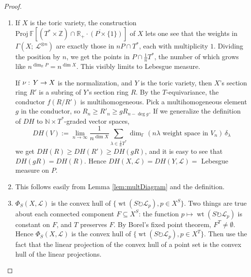 \documentclass[10pt,a4paper]{amsart}
\DeclareMathOperator{\wt}{wt}
\newcommand{\RR}{\mathbb{R}}
\newcommand{\ZZ}{\mathbb{Z}}
\newcommand{\NN}{\mathbb{N}}
\newcommand\wh\widehat
\newcommand\FF{{\mathbb F}}
\newcommand\tensor\otimes
\newcommand\calL{{\mathcal L}}
\newcommand\onto\twoheadrightarrow
\newcommand\junk[1]{}
\newcommand\actson\circlearrowright
\renewcommand{\colon}{\mathrel{:}}
\renewcommand{\colon}{:\mkern\thinmuskip}
\begin{document}
\begin{proof}
  \begin{enumerate}
  \item If $X$ is the toric variety, the construction ${\mathrm {Proj}}\
   \FF\left[(T^* \times \ZZ) \cap \overline{\RR_+\cdot (P \times \{1\})}\right]$
    of $X$ lets
    one see that the weights in $\Gamma(X;\ \calL^{\tensor n})$ are exactly those
    in $nP \cap T^*$, each with multiplicity $1$. Dividing the position by $n$,
    we get the points in $P \cap \frac{1}{n}T^*$, the number of which grows like
    $n^{\dim_\RR P} = n^{\dim X}$. This visibly limits to Lebesgue measure.

    If $\nu\colon Y\to X$ is the normalization, and $Y$ is the toric variety,
    then $X$'s section ring $R'$ is a subring of $Y$'s section ring $R$.
    By the $T$-equivariance, the conductor $f(R/R')$ is multihomogeneous.
    Pick a multihomogeneous element $g$ in the conductor,
    so $R_n \geq R'_n \geq g R_{n-\deg g}$. If we generalize the definition
    of $DH$ to $\NN\times T^*$-graded vector spaces,
    \[ DH(V) :=  \lim_{n\to\infty} \frac{1}{n^{\dim X}}
    \sum_{\lambda \in \frac{1}{n}T^*}
    \dim_\FF(n\lambda\text{ weight space in }V_n)    \, \delta_\lambda
    \]
    we get $DH(R) \geq DH(R') \geq DH(gR)$, and it is easy to see
    that $DH(gR) = DH(R)$. Hence $DH(X,\calL) = DH(Y,\calL)=$ Lebesgue measure
    on $P$.
  \item This follows easily from Lemma \ref{lem:multDiagram} and the definition.
  \item $\Phi_S(X,\calL)$ is the convex hull of $\{\wt(S\actson \calL_p), p\in X^S\}$.
    Two things are true about each connected component $F \subseteq X^S$:
    the function $p\mapsto \wt(S\actson \calL_p)$ is constant on $F$,
    and $T$ preserves $F$. By Borel's fixed point theorem, $F^T \neq \emptyset$.
    Hence $\Phi_S(X,\calL)$ is the convex hull of $\{\wt(S\actson \calL_p), p\in X^T\}$.
    Then use the fact that the linear projection of the convex hull of a point set 
    is the convex hull of the linear projections.
    \junk{
  \item Pick a point $p\in X^T$ (using Borel's theorem again) and let
    $\lambda := \wt(T\actson \calL_p)$, so $T$ acts trivially on
    $(\calL \tensor \FF_{-\lambda})_p$ where the second factor
    is the trivial (but not equivariantly trivial) line bundle.
    Let $R \leq T$ be the generic stabilizer, or equivalently, be the kernel
    of the action on $X$. Since $R$ acts trivially on $X$,
    it acts with the same weight on each fiber of $\calL \tensor \FF_{-\lambda}$,
    which (checking at $p$) is $0$. 
    Let $h$ be the projection $T \onto T/R$, and use (2) to obtain
    $$ \Phi_T(X,\calL)
    = \Phi_T(X,\calL\tensor \FF_{-\lambda}) + \lambda
    = \wh h\left(\Phi_{T/R}(X,\calL\tensor \FF_{-\lambda})\right) + \lambda $$
    hence
    $$ \dim_\RR \Phi_T(X,\calL) = \dim_\RR \Phi_{T/R}(X,\calL\tensor \FF_{-\lambda}) $$
    reducing the statement to the case of faithfully acting tori.

}
\end{enumerate}
\end{proof}
\end{document}
